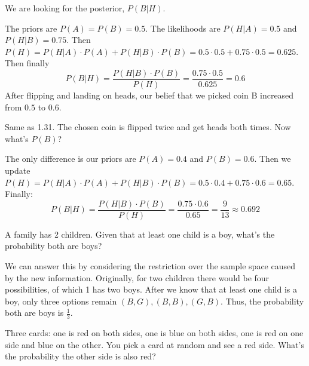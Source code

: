 \begin{solution}
We are looking for the posterior, $P(B|H)$.

The priors are $P(A) = P(B) = 0.5$. The likelihoods are $P(H|A) = 0.5$ and $P(H|B) = 0.75$. Then $P(H) = P(H|A) \cdot P(A) + P(H|B) \cdot P(B) = 0.5 \cdot 0.5 + 0.75 \cdot 0.5 = 0.625$. Then finally
\[
P(B|H) = \frac{P(H|B) \cdot P(B)}{P(H)} = \frac{0.75 \cdot 0.5}{0.625} = 0.6
\]
After flipping and landing on heads, our belief that we picked coin B increased from $0.5$ to $0.6$.
\end{solution}

\begin{problem}
Same as 1.31. The chosen coin is flipped twice and get heads both times. Now what's $P(B)$?
\end{problem}

\begin{solution}
The only difference is our priors are $P(A) = 0.4$ and $P(B) = 0.6$. Then we update $P(H) = P(H|A) \cdot P(A) + P(H|B) \cdot P(B) = 0.5 \cdot 0.4 + 0.75 \cdot 0.6 = 0.65$. Finally:
\[
P(B|H) = \frac{P(H|B) \cdot P(B)}{P(H)} = \frac{0.75 \cdot 0.6}{0.65} = \frac{9}{13} \approx 0.692
\]
\end{solution}

\newpage

\begin{problem}
A family has 2 children. Given that at least one child is a boy, what's the probability both are boys?
\end{problem}

\begin{solution}
We can answer this by considering the restriction over the sample space caused by the new information. Originally, for two children there would be four possibilities, of which 1 has two boys. After we know that at least one child is a boy, only three options remain $(B,G), (B,B), (G, B)$. Thus, the probability both are boys is $\frac{1}{3}$.
\end{solution}

\begin{problem}
Three cards: one is red on both sides, one is blue on both sides, one is red on one side and blue on the other. You pick a card at random and see a red side. What's the probability the other side is also red?
\end{problem}

